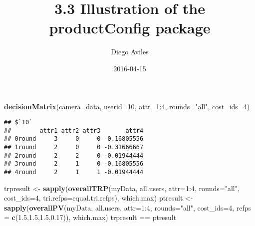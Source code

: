 \documentclass[]{article}
\title{3.3 Illustration of the productConfig package}
\author{Diego Aviles}
\date{2016-04-15}
\newenvironment{Shaded}{\begin{snugshade}}{\end{snugshade}}
\newcommand{\KeywordTok}[1]{\textcolor[rgb]{0.13,0.29,0.53}{\textbf{{#1}}}}
\newcommand{\DataTypeTok}[1]{\textcolor[rgb]{0.13,0.29,0.53}{{#1}}}
\newcommand{\DecValTok}[1]{\textcolor[rgb]{0.00,0.00,0.81}{{#1}}}
\newcommand{\FloatTok}[1]{\textcolor[rgb]{0.00,0.00,0.81}{{#1}}}
\newcommand{\StringTok}[1]{\textcolor[rgb]{0.31,0.60,0.02}{{#1}}}
\newcommand{\NormalTok}[1]{{#1}}
\begin{document}
\maketitle

\begin{Shaded}
\begin{Highlighting}[]
\KeywordTok{decisionMatrix}\NormalTok{(camera_data, }\DataTypeTok{userid=}\DecValTok{10}\NormalTok{, }\DataTypeTok{attr=}\DecValTok{1}\NormalTok{:}\DecValTok{4}\NormalTok{, }\DataTypeTok{rounds=}\StringTok{"all"}\NormalTok{, }\DataTypeTok{cost_ids=}\DecValTok{4}\NormalTok{)}
\end{Highlighting}
\end{Shaded}

\begin{verbatim}
## $`10`
##        attr1 attr2 attr3       attr4
## 0round     3     0     0 -0.16805556
## 1round     2     0     0 -0.31666667
## 2round     2     2     0 -0.01944444
## 3round     2     1     0 -0.16805556
## 4round     2     1     1 -0.01944444
\end{verbatim}

\begin{Shaded}
\begin{Highlighting}[]
\NormalTok{trpresult <-}\StringTok{ }\KeywordTok{sapply}\NormalTok{(}\KeywordTok{overallTRP}\NormalTok{(myData, all.users, }\DataTypeTok{attr=}\DecValTok{1}\NormalTok{:}\DecValTok{4}\NormalTok{, }\DataTypeTok{rounds=}\StringTok{"all"}\NormalTok{,}
                            \DataTypeTok{cost_ids=}\DecValTok{4}\NormalTok{, }\DataTypeTok{tri.refps=}\NormalTok{equal.tri.refps), which.max)}
\NormalTok{ptresult <-}\StringTok{ }\KeywordTok{sapply}\NormalTok{(}\KeywordTok{overallPV}\NormalTok{(myData, all.users, }\DataTypeTok{attr=}\DecValTok{1}\NormalTok{:}\DecValTok{4}\NormalTok{, }\DataTypeTok{rounds=}\StringTok{"all"}\NormalTok{, }
                           \DataTypeTok{cost_ids=}\DecValTok{4}\NormalTok{, }\DataTypeTok{refps =} \KeywordTok{c}\NormalTok{(}\FloatTok{1.5}\NormalTok{,}\FloatTok{1.5}\NormalTok{,}\FloatTok{1.5}\NormalTok{,}\FloatTok{0.17}\NormalTok{)), which.max)}
\NormalTok{trpresult ==}\StringTok{ }\NormalTok{ptresult}
\end{Highlighting}
\end{Shaded}
\end{document}

